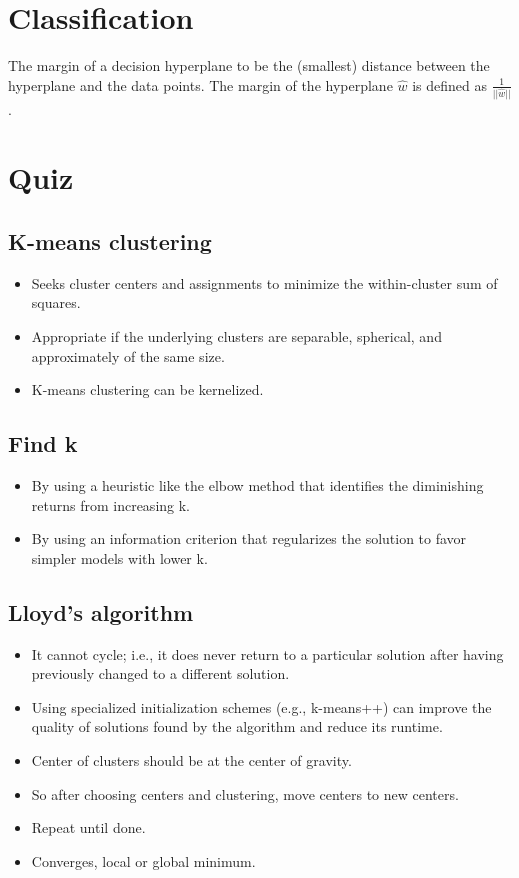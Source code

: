 \documentclass{article}
\begin{document}
\section{Classification}
The margin of a decision hyperplane to be the (smallest) distance between the hyperplane and the data points. The margin of the hyperplane $\hat{w}$ is defined as $\frac{1}{||\hat{w}||}$.

\section{Quiz}
\subsection{K-means clustering}
\begin{itemize}
    \item Seeks cluster centers and assignments to minimize the within-cluster sum of squares.
    \item Appropriate if the underlying clusters are separable, spherical, and approximately of the same size.
    \item K-means clustering can be kernelized.
\end{itemize}

\subsection{Find k}
\begin{itemize}
    \item By using a heuristic like the elbow method that identifies the diminishing returns from increasing k.
    \item By using an information criterion that regularizes the solution to favor simpler models with lower k.
\end{itemize}

\subsection{Lloyd's algorithm}
\begin{itemize}
    \item It cannot cycle; i.e., it does never return to a particular solution after having previously changed to a different solution.
    \item Using specialized initialization schemes (e.g., k-means++) can improve the quality of solutions found by the algorithm and reduce its runtime.
    \item Center of clusters should be at the center of gravity.
    \item So after choosing centers and clustering, move centers to new centers.
    \item Repeat until done.
    \item Converges, local or global minimum.
\end{itemize}
\end{document}
